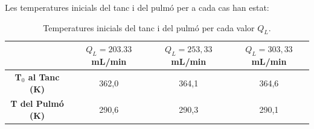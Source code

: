 \documentclass[10pt, twoside]{article}
\begin{document}
Les temperatures inicials del tanc i del pulmó per a cada cas han estat:

\begin{table}[h!]
    \centering
    \caption{Temperatures inicials del tanc i del pulmó per cada valor $Q_L$.}
    \begin{tabular}{cccc}
        \toprule
        & $Q_L = 203.33$ mL/min & $Q_L = 253,33$ mL/min & $Q_L = 303,33$ mL/min \\
        \midrule
        \textbf{T$_0$ al Tanc (K)} & 362,0 & 364,1 & 364,6 \\
        \textbf{T del Pulmó (K)}  & 290,6 & 290,3 & 290,1 \\
        \bottomrule
    \end{tabular}
    \label{tabla:temperaturas}
\end{table}
\end{document}
